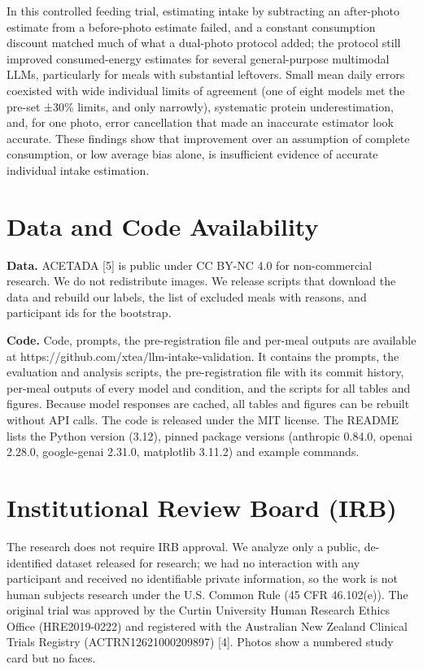 \documentclass[
  11pt,
  letterpaper]{article}
\begin{document}
In this controlled feeding trial, estimating intake by subtracting an after-photo estimate from a before-photo
estimate failed, and a constant consumption discount matched much of what a dual-photo protocol added; the
protocol still improved consumed-energy estimates for several general-purpose multimodal LLMs, particularly
for meals with substantial leftovers. Small mean daily errors coexisted with wide individual limits of
agreement (one of eight models met the pre-set ±30\% limits, and only narrowly), systematic protein
underestimation, and, for one photo, error cancellation that made an inaccurate estimator look accurate. These
findings show that improvement over an assumption of complete consumption, or low average bias alone, is
insufficient evidence of accurate individual intake estimation.

\section*{Data and Code Availability}\label{data-and-code-availability}

\textbf{Data.} ACETADA {[}5{]} is public under CC BY-NC 4.0 for non-commercial research. We do not
redistribute images. We release scripts that download the data and rebuild our labels, the list of excluded
meals with reasons, and participant ids for the bootstrap.

\textbf{Code.} Code, prompts, the pre-registration file and per-meal outputs are available at
https://github.com/xtea/llm-intake-validation. It contains the prompts, the evaluation and analysis scripts,
the pre-registration file with its commit history, per-meal outputs of every model and condition, and the
scripts for all tables and figures. Because model responses are cached, all tables and figures can be rebuilt
without API calls. The code is released under the MIT license. The README lists the Python version (3.12),
pinned package versions (anthropic 0.84.0, openai 2.28.0, google-genai 2.31.0, matplotlib 3.11.2) and example
commands.

\section*{Institutional Review Board (IRB)}\label{institutional-review-board-irb}

The research does not require IRB approval. We analyze only a public, de-identified dataset released for
research; we had no interaction with any participant and received no identifiable private information, so the
work is not human subjects research under the U.S. Common Rule (45 CFR 46.102(e)). The original trial was
approved by the Curtin University Human Research Ethics Office (HRE2019-0222) and registered with the
Australian New Zealand Clinical Trials Registry (ACTRN12621000209897) {[}4{]}. Photos show a numbered study
card but no faces.
\end{document}
